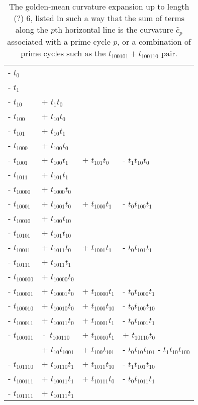 

\begin{table}
\caption[]{\small
The golden-mean curvature expansion %
up to length (?)
$6$, listed in such a way that the sum of terms along the $p$th horizontal
line is the curvature $\hat{c}_p$ associated with a prime cycle $p$, or a
combination of prime cycles such as the $t_{100101}+t_{100110}$ pair.
  }
\renewcommand{\arraystretch}{0.7}
\begin{tabular}{llll}
- $t_0$ & & & \\
- $t_1$ & & & \\ \hline
- $t_{10}$ &  + $t_1 t_0$  & & \\ \hline
- $t_{100}$ &  + $t_{10} t_0$  & & \\
- $t_{101}$ &  + $t_{10} t_1$ & & \\ \hline
- $t_{1000}$ &  + $t_{100} t_0$ & & \\
- $t_{1001}$ &  + $t_{100} t_1$ & + $t_{101}t_0$ & -  $ t_1 t_{10} t_0$ \\
- $t_{1011}$ &  + $t_{101} t_1$ & & \\ \hline
- $t_{10000}$ &  + $t_{1000} t_0$ & & \\
- $t_{10001}$ &  + $t_{1001} t_0$ & + $t_{1000} t_1$ & -  $ t_0 t_{100} t_1$  \\
- $t_{10010}$ &  + $t_{100} t_{10}$ & & \\
- $t_{10101}$ &  + $t_{101} t_{10}$  & & \\
- $t_{10011}$ &  + $t_{1011} t_0$ & + $t_{1001} t_1$ & -  $ t_0 t_{101} t_1$  \\
- $t_{10111}$ &  + $t_{1011} t_{1} $ & & \\ \hline
- $t_{100000}$ &  + $t_{10000} t_{0}$ & & \\
- $t_{100001}$ &  + $t_{10001} t_0$ &  +
$t_{10000} t_1$& -  $t_0 t_{1000} t_1$  \\
- $t_{100010}$ &  + $t_{10010} t_0$&  +
$t_{1000} t_{10}$ & -  $t_0 t_{100} t_{10}$  \\
- $t_{100011}$ &  + $t_{10011} t_0$  &  +
$t_{10001} t_1$ & -  $t_0 t_{1001} t_1$\\
%
- $t_{100101}$ &
\,-\, $t_{100110}$ &
    + $ t_{10010} t_1$ &  + $t_{10110} t_0$ \\
 & + $t_{10} t_{1001}$ &  +
             $t_{100} t_{101}$& -  $t_0 t_{10} t_{101}$ -  $t_1 t_{10} t_{100}$ \\
- $t_{101110}$ &  + $t_{10110} t_1$  &  +
$t_{1011} t_{10}$& -  $t_1 t_{101} t_{10}$ \\
- $t_{100111}$ &  + $t_{10011} t_1$  &  +
$t_{10111} t_0$ & -  $t_0 t_{1011} t_1$\\
- $t_{101111}$ &  + $t_{10111} t_1$ & &
%
\end{tabular}
\renewcommand{\arraystretch}{1.0}
\label{t-mal-2GM}
\end{table}

